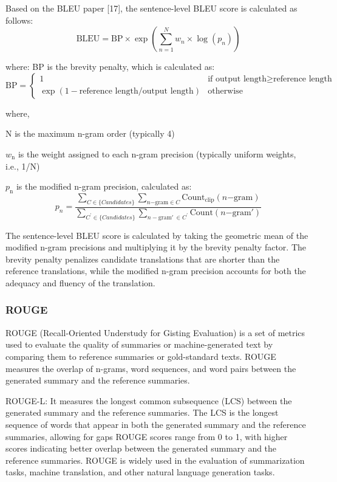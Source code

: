 \documentclass[pdflatex,sn-mathphys-num]{sn-jnl}%
\begin{document}
Based on the BLEU paper [17], the sentence-level BLEU score is calculated as follows:
\begin{equation}
    \text{BLEU} = \text{BP} \times \exp\left(\sum_{n=1}^{N} w_n \times \log(p_n)\right)
\end{equation}


where:
BP is the brevity penalty, which is calculated as:
\begin{equation}
    \text{BP} = \begin{cases} 
1 & \text{if output length} \geq \text{reference length} \\
\exp(1 - \text{reference length} / \text{output length}) & \text{otherwise}
\end{cases}
\end{equation}

where,

N is the maximum n-gram order (typically 4)

$w_{\mathrm{n}}$ is the weight assigned to each n-gram precision (typically uniform weights, i.e., 1/N)

$p_{\mathrm{n}}$ is the modified n-gram precision, calculated as:
\begin{equation}
    p_n=\frac{\sum_{C\in\{Candidates\}}\sum_{n\mathrm{-gram}\in C}{{\mathrm{Count}}_{\mathrm{clip}}\left(n\mathrm{-gram}\right)}}{\sum_{C^\prime\in\{Candidates\}}\sum_{n-\mathrm{gram'\ }\in C^\prime}\mathrm{Count}\left(n\mathrm{-gram'}\right)}
\end{equation}

The sentence-level BLEU score is calculated by taking the geometric mean of the modified n-gram precisions and multiplying it by the brevity penalty factor. The brevity penalty penalizes candidate translations that are shorter than the reference translations, while the modified n-gram precision accounts for both the adequacy and fluency of the translation.

\subsubsection{ROUGE}\label{subsubsec4.2.2}
ROUGE (Recall-Oriented Understudy for Gisting Evaluation) is a set of metrics used to evaluate the quality of summaries or machine-generated text by comparing them to reference summaries or gold-standard texts. ROUGE measures the overlap of n-grams, word sequences, and word pairs between the generated summary and the reference summaries. 

ROUGE-L: It measures the longest common subsequence (LCS) between the generated summary and the reference summaries. The LCS is the longest sequence of words that appear in both the generated summary and the reference summaries, allowing for gaps
ROUGE scores range from 0 to 1, with higher scores indicating better overlap between the generated summary and the reference summaries. ROUGE is widely used in the evaluation of summarization tasks, machine translation, and other natural language generation tasks.
\end{document}
